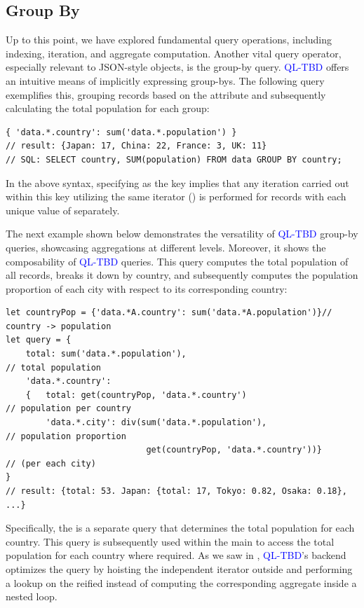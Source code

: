 \documentclass[runningheads]{llncs}
\newcommand{\lang}{\textcolor{blue}{QL-TBD}}
\begin{document}
\subsection{Group By}\label{subsec:groupby}
Up to this point, we have explored fundamental query operations, including indexing,
iteration, and aggregate computation.
Another vital query operator, especially relevant to JSON-style objects,
is the group-by query.
\lang{} offers an intuitive means of implicitly expressing group-bys.
The following query exemplifies this, grouping records based on the
 attribute and subsequently calculating the total population
for each group:

\begin{lstlisting}[style=JavaScript, columns=flexible, numbers=none]
{ 'data.*.country': sum('data.*.population') }
// result: {Japan: 17, China: 22, France: 3, UK: 11}
// SQL: SELECT country, SUM(population) FROM data GROUP BY country;
\end{lstlisting}

In the above syntax, specifying  as the key implies
that any iteration carried out within this key utilizing the same
iterator (\inline{*}) is performed for records with each unique value of 
separately.

The next example shown below demonstrates the versatility of \lang{} group-by queries, showcasing
aggregations at different levels.
Moreover, it shows the composability of \lang{} queries.
This query computes the total population of all records, breaks it down by country,
and subsequently computes the population proportion of each city with respect to its
corresponding country:

\begin{lstlisting}[style=JavaScript, columns=flexible, numbers=none]
let countryPop = {'data.*A.country': sum('data.*A.population')}// country -> population
let query = { 
    total: sum('data.*.population'),                                  // total population
    'data.*.country':
    {   total: get(countryPop, 'data.*.country')                      // population per country
        'data.*.city': div(sum('data.*.population'),                  // population proportion
                            get(countryPop, 'data.*.country'))}       // (per each city)
}
// result: {total: 53. Japan: {total: 17, Tokyo: 0.82, Osaka: 0.18}, ...}
\end{lstlisting}

Specifically, the  is a separate query that determines the total
population for each country.
This query is subsequently used within the main  to access the
total population for each country where required.
As we saw in , \lang{}'s backend optimizes the
query by hoisting the independent  iterator outside and performing
a lookup on the reified  instead of computing the
corresponding aggregate inside a nested loop.
\end{document}
